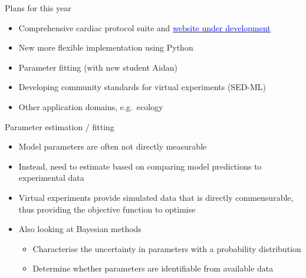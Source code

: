 \documentclass[t,xcolor={usenames,dvipsnames}]{beamer}
\newcommand{\myhref}[2]{\href{#1}{\textcolor{Blue}{#2}}}
\begin{document}
\begin{frame}{Plans for this year}
\begin{itemize}
\item Comprehensive cardiac protocol suite and \myhref{https://userpc58.cs.ox.ac.uk/FunctionalCuration}{website under development}
\item New more flexible implementation using Python
\item Parameter fitting (with new student Aidan)
\item Developing community standards for virtual experiments (SED-ML)
\item Other application domains, e.g.\ ecology
\end{itemize}
\end{frame}


\begin{frame}{Parameter estimation / fitting}
\begin{itemize}
\item Model parameters are often not directly measurable
\item Instead, need to estimate based on comparing model predictions to experimental data
\item Virtual experiments provide simulated data that is directly commensurable, thus providing the objective function to optimise
\item Also looking at Bayesian methods
  \begin{itemize}
  \item Characterise the uncertainty in parameters with a probability distribution
  \item Determine whether parameters are identifiable from available data
  \end{itemize}
\end{itemize}
\end{frame}
\end{document}
